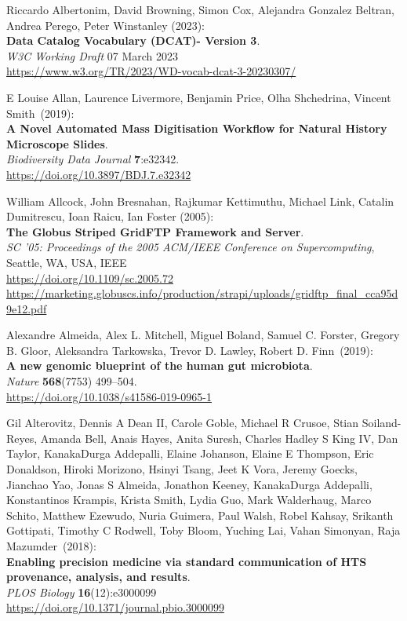 \begin{thebibliography}{9}
Riccardo Albertonim, David Browning, Simon Cox, Alejandra Gonzalez Beltran, Andrea Perego, Peter Winstanley (2023): \\
\textbf{Data Catalog Vocabulary (DCAT)- Version 3}.\\
\emph{W3C Working Draft} 07 March 2023\\
\url{https://www.w3.org/TR/2023/WD-vocab-dcat-3-20230307/}

E Louise Allan, Laurence Livermore, Benjamin Price, Olha Shchedrina, Vincent Smith~(2019):\\
\textbf{A Novel Automated Mass Digitisation Workflow for Natural
History Microscope Slides}.\\
\emph{Biodiversity Data Journal} \textbf{7}:e32342.\\
\url{https://doi.org/10.3897/BDJ.7.e32342}

William Allcock, John Bresnahan, Rajkumar Kettimuthu, Michael Link, Catalin Dumitrescu, Ioan Raicu, Ian Foster (2005):\\
\textbf{The Globus Striped GridFTP Framework and Server}.\\
\emph{{SC '05: Proceedings of the 2005 ACM/IEEE Conference on Supercomputing}},
{Seattle, WA, USA}, {IEEE} \\
\url{https://doi.org/10.1109/sc.2005.72}\\
\url{https://marketing.globuscs.info/production/strapi/uploads/gridftp_final_cca95d9e12.pdf}

Alexandre Almeida, Alex L. Mitchell, Miguel Boland, Samuel C.
Forster, Gregory B. Gloor, Aleksandra Tarkowska, Trevor D. Lawley,
Robert D. Finn~(2019):\\
\textbf{A new genomic blueprint of the human gut microbiota}.\\
\emph{Nature} \textbf{568}(7753) 499--504.\\
\url{https://doi.org/10.1038/s41586-019-0965-1}

Gil Alterovitz, Dennis A Dean II, Carole Goble, Michael R
Crusoe, Stian Soiland-Reyes, Amanda Bell, Anais Hayes, Anita Suresh,
Charles Hadley S King IV, Dan Taylor, KanakaDurga Addepalli, Elaine
Johanson, Elaine E Thompson, Eric Donaldson, Hiroki Morizono, Hsinyi
Tsang, Jeet K Vora, Jeremy Goecks, Jianchao Yao, Jonas S Almeida,
Jonathon Keeney, KanakaDurga Addepalli, Konstantinos Krampis, Krista
Smith, Lydia Guo, Mark Walderhaug, Marco Schito, Matthew Ezewudo, Nuria
Guimera, Paul Walsh, Robel Kahsay, Srikanth Gottipati, Timothy C
Rodwell, Toby Bloom, Yuching Lai, Vahan Simonyan, Raja Mazumder~(2018):\\
\textbf{Enabling precision medicine via standard communication of HTS
provenance, analysis, and results}.\\
\emph{PLOS Biology} \textbf{16}(12):e3000099\\
\url{https://doi.org/10.1371/journal.pbio.3000099}


\end{thebibliography}
